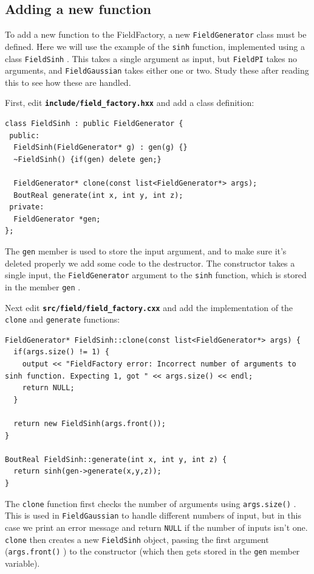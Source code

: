 \documentclass[12pt]{article}
\newcommand{\file}[1]{\texttt{\bf #1}}
\begin{document}
\subsection{Adding a new function}
%
To add a new function to the FieldFactory, a new
%
\lstinline!FieldGenerator!
%
 class must be defined. Here we will use the example of the
%
\lstinline!sinh!
%
 function, implemented using a class
%
\lstinline!FieldSinh!
%
. This takes a single argument as input, but
%
\lstinline!FieldPI! takes no arguments, and \lstinline!FieldGaussian!
%
 takes either one or two.  Study these after reading this to see how these are
 handled.

First, edit \file{include/field\_factory.hxx} and add a class definition:
%
\begin{lstlisting}[firstnumber=122]
class FieldSinh : public FieldGenerator {
 public:
  FieldSinh(FieldGenerator* g) : gen(g) {}
  ~FieldSinh() {if(gen) delete gen;}

  FieldGenerator* clone(const list<FieldGenerator*> args);
  BoutReal generate(int x, int y, int z);
 private:
  FieldGenerator *gen;
};
\end{lstlisting}
%
The
%
\lstinline!gen!
%
 member is used to store the input argument, and to make sure it's deleted
 properly we add some code to the destructor. The constructor takes a single
 input, the
%
\lstinline!FieldGenerator! argument to the \lstinline!sinh! function, which is
stored in the member \lstinline!gen!
%
.

Next edit \file{src/field/field\_factory.cxx} and add the implementation of the
%
\lstinline!clone!
%
 and
%
\lstinline!generate!
%
 functions:
%
\begin{lstlisting}[firstnumber=100]
FieldGenerator* FieldSinh::clone(const list<FieldGenerator*> args) {
  if(args.size() != 1) {
    output << "FieldFactory error: Incorrect number of arguments to sinh function. Expecting 1, got " << args.size() << endl;
    return NULL;
  }

  return new FieldSinh(args.front());
}

BoutReal FieldSinh::generate(int x, int y, int z) {
  return sinh(gen->generate(x,y,z));
}
\end{lstlisting}
%
The
%
\lstinline!clone! function first checks the number of arguments using
\lstinline!args.size()!
%
. This is used in
%
\lstinline!FieldGaussian!
%
 to handle different numbers of input, but in this case we print an error
 message and return
%
\lstinline!NULL! if the number of inputs isn't one. \lstinline!clone!
%
 then creates a new
%
\lstinline!FieldSinh! object, passing the first argument
(\lstinline!args.front()!
%
) to the constructor (which then gets stored in the
%
\lstinline!gen!
%
 member variable).
\end{document}
